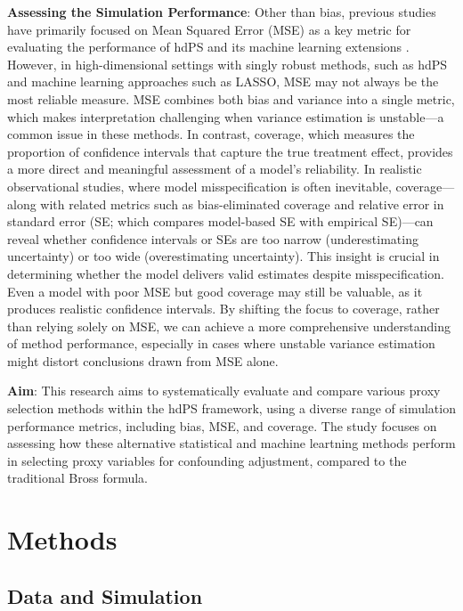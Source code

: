 \documentclass[sn-vancouver,Numbered,lineno,pdflatex]{sn-jnl}
\begin{document}
\textbf{Assessing the Simulation Performance}: Other than bias, previous
studies have primarily focused on Mean Squared Error (MSE) as a key
metric for evaluating the performance of hdPS and its machine learning
extensions
\citep{franklin2015regularized, pang2016effect, wyss2018using, karim2018can, simon2023evaluating}.
However, in high-dimensional settings with singly robust methods, such
as hdPS and machine learning approaches such as LASSO, MSE may not
always be the most reliable measure. MSE combines both bias and variance
into a single metric, which makes interpretation challenging when
variance estimation is unstable---a common issue in these methods. In
contrast, coverage, which measures the proportion of confidence
intervals that capture the true treatment effect, provides a more direct
and meaningful assessment of a model's reliability. In realistic
observational studies, where model misspecification is often inevitable,
coverage---along with related metrics such as bias-eliminated coverage
and relative error in standard error (SE; which compares model-based SE
with empirical SE)---can reveal whether confidence intervals or SEs are
too narrow (underestimating uncertainty) or too wide (overestimating
uncertainty). This insight is crucial in determining whether the model
delivers valid estimates despite misspecification. Even a model with
poor MSE but good coverage may still be valuable, as it produces
realistic confidence intervals. By shifting the focus to coverage,
rather than relying solely on MSE, we can achieve a more comprehensive
understanding of method performance, especially in cases where unstable
variance estimation might distort conclusions drawn from MSE alone.

\textbf{Aim}: This research aims to systematically evaluate and compare
various proxy selection methods within the hdPS framework, using a
diverse range of simulation performance metrics, including bias, MSE,
and coverage. The study focuses on assessing how these alternative
statistical and machine leartning methods perform in selecting proxy
variables for confounding adjustment, compared to the traditional Bross
formula.

\section{Methods}\label{methods}

\subsection*{Data and Simulation}\label{data-and-simulation}
\end{document}
